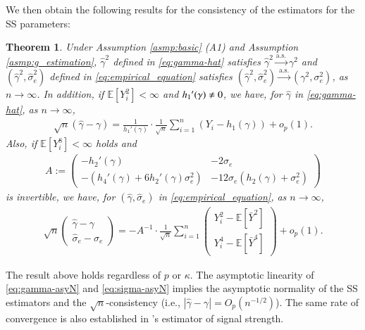 \documentclass[12pt,reqno]{amsart}
\newtheorem{theorem}{Theorem}
\newcommand{\E}{\mathbb{E}}
\newcommand{\cc}{\color{black}}
\newcommand{\ccc}{\color{black}}
\renewcommand{\hat}{\widehat}
\begin{document}
We then obtain the following results for the consistency of the estimators for the SS parameters:

\begin{theorem}
\label{thm:consistent_moment}
    Under Assumption \ref{asmp:basic} (A1) and Assumption \ref{asmp:g_estimation}, $\hat{\gamma}^2$ defined in \eqref{eq:gamma-hat} satisfies $\hat\gamma^2\overset{\mathrm{a.s.}}{\longrightarrow}\gamma^2$
    and $(\hat\gamma^2,\hat\sigma_e^2)$ defined in \eqref{eq:empirical_equation} satisfies $(\hat\gamma^2,\hat\sigma_e^2)\overset{\mathrm{a.s.}}{\longrightarrow}(\gamma^2,\sigma_e^2)$, as {\cc $n\to\infty$}.
{\cc
    In addition, if $\E[Y_i^2]<\infty$ and $h_{\ccc1}'(\gamma)\neq0$,
    we have, for $\hat{\gamma}$ in \eqref{eq:gamma-hat}, as $n\to\infty$,
    \begin{align}
    \label{eq:gamma-asyN}
        \sqrt{n}(\hat\gamma-\gamma)=\frac{1}{h_1'(\gamma)}\cdot\frac{1}{\sqrt{n}}\sum_{i=1}^n(Y_i-h_1(\gamma))+o_p(1).
    \end{align}
    Also, if $\E[Y_i^8]<\infty$ holds and
    \begin{align}
        A:=	\begin{pmatrix}
   -h_2'(\gamma) & -2\sigma_e \\
   -(h_4'(\gamma)+6h_2'(\gamma)\sigma_e^2) & -12\sigma_e(h_2(\gamma)+\sigma_e^2)
\end{pmatrix}
    \end{align}
    is invertible,
    we have, for $(\hat\gamma,\hat\sigma_e)$ in \eqref{eq:empirical_equation}, as $n\to\infty$,
    \begin{align}
    \label{eq:sigma-asyN}
        \sqrt{n}
        \begin{pmatrix}
            \hat{\gamma}-\gamma\\\hat\sigma_e-\sigma_e
        \end{pmatrix}
        =-A^{-1}\cdot\frac{1}{\sqrt{n}}\sum_{i=1}^n
        \begin{pmatrix}
            Y_i^2-\E[\bar Y^2]\\
            Y_i^4-\E[\bar Y^4]
        \end{pmatrix}
        +o_p(1).
    \end{align}
}
\end{theorem}
{\cc
The result above holds regardless of $p$ or $\kappa$.
The asymptotic linearity of \eqref{eq:gamma-asyN} and \eqref{eq:sigma-asyN} implies the asymptotic normality of the SS estimators and the  $\sqrt{n}$-consistency (i.e., $|\hat{\gamma} - \gamma | = O_p( n^{-1/2})$).
The same rate of convergence is also established in \citep{chen2024method}'s estimator of signal strength.
}
\end{document}
